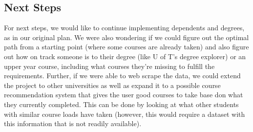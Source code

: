 \documentclass[fontsize=11pt]{article}
\begin{document}
\subsection{Next Steps}
For next steps, we would like to continue implementing dependents and degrees, as in our original plan. We were also wondering if we could figure out the optimal path from a starting point (where some courses are already taken) and also figure out how on track someone is to their degree (like U of T’s degree explorer) or an upper year course, including what courses they’re missing to fulfill the requirements. Further, if we were able to web scrape the data, we could extend the project to other universities as well as expand it to a possible course recommendation system that gives the user good courses to take base don what they currently completed. This can be done by looking at what other students with similar course loads have taken (however, this would require a dataset with this information that is not readily available).
\end{document}
